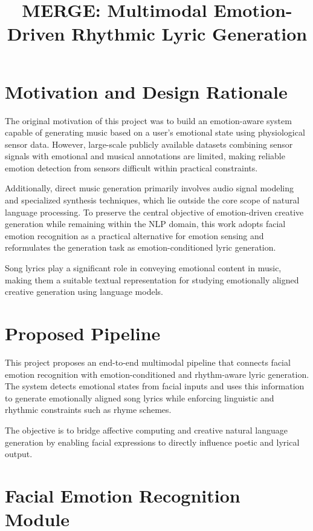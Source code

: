 \documentclass[11pt]{article}
\title{\textbf{MERGE: Multimodal Emotion-Driven Rhythmic Lyric Generation}}
\author{}
\date{}
\begin{document}
\maketitle
\onehalfspacing

\section{Motivation and Design Rationale}

The original motivation of this project was to build an emotion-aware system capable of generating music based on a user’s emotional state using physiological sensor data. However, large-scale publicly available datasets combining sensor signals with emotional and musical annotations are limited, making reliable emotion detection from sensors difficult within practical constraints.

Additionally, direct music generation primarily involves audio signal modeling and specialized synthesis techniques, which lie outside the core scope of natural language processing. To preserve the central objective of emotion-driven creative generation while remaining within the NLP domain, this work adopts facial emotion recognition as a practical alternative for emotion sensing and reformulates the generation task as emotion-conditioned lyric generation.

Song lyrics play a significant role in conveying emotional content in music, making them a suitable textual representation for studying emotionally aligned creative generation using language models.

\section{Proposed Pipeline}

This project proposes an end-to-end multimodal pipeline that connects facial emotion recognition with emotion-conditioned and rhythm-aware lyric generation. The system detects emotional states from facial inputs and uses this information to generate emotionally aligned song lyrics while enforcing linguistic and rhythmic constraints such as rhyme schemes.

The objective is to bridge affective computing and creative natural language generation by enabling facial expressions to directly influence poetic and lyrical output.

\section{Facial Emotion Recognition Module}
\end{document}
